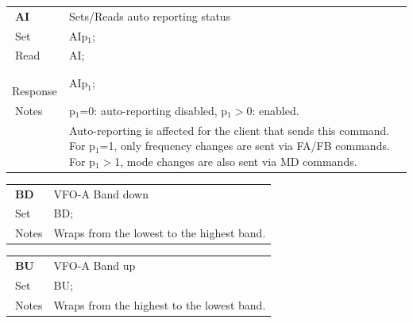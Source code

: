\documentclass[12pt]{book}
\begin{document}
\begin{center}
\begin{tabular}{|p{2cm}|p{11cm}|}
\toprule
$\phantom{\Big|}$\textbf{\large AI} & Sets/Reads auto reporting status \\\cline{1-2}
$\phantom{\Big|}${\large Set} & {AIp$_1$;} \\\hline
$\phantom{\Big|}${\large Read} & {AI;} \\\hline
$\phantom{\Big|}${\large Response} & {AIp$_1$;} \\\hline
$\phantom{\Big|}${\large Notes} & \multicolumn{1}{|p{11cm}|}{p$_1$=0: auto-reporting disabled, p$_1$$>$0: enabled.} \\
 & \multicolumn{1}{|p{11cm}|}{Auto-reporting is affected for the client that sends this command. For p$_1$=1, only frequency changes are sent via FA/FB commands. For p$_1$$>$1, mode changes are also sent via MD commands.} \\
\bottomrule
\end{tabular}
\end{center}

\begin{center}
\begin{tabular}{|p{2cm}|p{11cm}|}
\toprule
$\phantom{\Big|}$\textbf{\large BD} & VFO-A Band down \\\cline{1-2}
$\phantom{\Big|}${\large Set} & {BD;} \\\hline
$\phantom{\Big|}${\large Notes} & \multicolumn{1}{|p{11cm}|}{Wraps from the lowest to the highest band.} \\
\bottomrule
\end{tabular}
\end{center}

\begin{center}
\begin{tabular}{|p{2cm}|p{11cm}|}
\toprule
$\phantom{\Big|}$\textbf{\large BU} & VFO-A Band up \\\cline{1-2}
$\phantom{\Big|}${\large Set} & {BU;} \\\hline
$\phantom{\Big|}${\large Notes} & \multicolumn{1}{|p{11cm}|}{Wraps from the highest to the lowest band.} \\
\bottomrule
\end{tabular}
\end{center}
\end{document}
